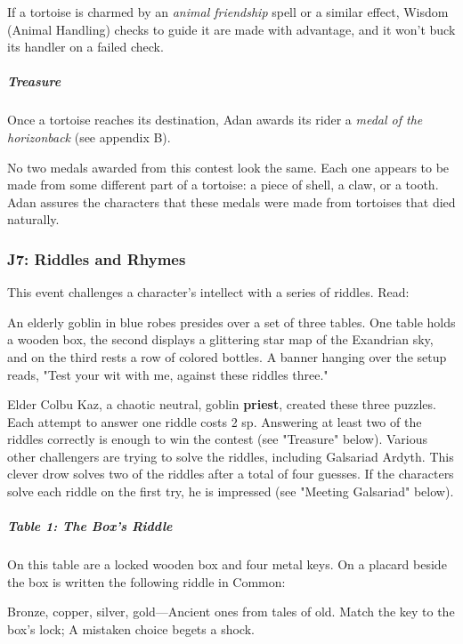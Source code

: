 \documentclass[10pt,a4paper,twoside,fancy,bg=print,twocolumn,openany,nodeprecatedcode]{dndbook}
\begin{document}
If a tortoise is charmed by an \textit{animal friendship} spell or a similar effect, Wisdom (Animal Handling) checks to guide it are made with advantage, and it won't buck its handler on a failed check.

\subparagraph{Treasure}
Once a tortoise reaches its destination, Adan awards its rider a \textit{medal of the horizonback} (see appendix B).

No two medals awarded from this contest look the same. Each one appears to be made from some different part of a tortoise: a piece of shell, a claw, or a tooth. Adan assures the characters that these medals were made from tortoises that died naturally.

\subsubsection{J7: Riddles and Rhymes}
This event challenges a character's intellect with a series of riddles. Read:

\begin{DndReadAloud}{}
An elderly goblin in blue robes presides over a set of three tables. One table holds a wooden box, the second displays a glittering star map of the Exandrian sky, and on the third rests a row of colored bottles. A banner hanging over the setup reads, "Test your wit with me, against these riddles three."

\end{DndReadAloud}

Elder Colbu Kaz, a chaotic neutral, goblin \textbf{priest}, created these three puzzles. Each attempt to answer one riddle costs 2 sp. Answering at least two of the riddles correctly is enough to win the contest (see "Treasure" below). Various other challengers are trying to solve the riddles, including Galsariad Ardyth. This clever drow solves two of the riddles after a total of four guesses. If the characters solve each riddle on the first try, he is impressed (see "Meeting Galsariad" below).

\subparagraph{Table 1: The Box's Riddle}
On this table are a locked wooden box and four metal keys. On a placard beside the box is written the following riddle in Common:

\begin{DndReadAloud}{}
Bronze, copper, silver, gold—Ancient ones from tales of old. Match the key to the box's lock; A mistaken choice begets a shock.

\end{DndReadAloud}
\end{document}
